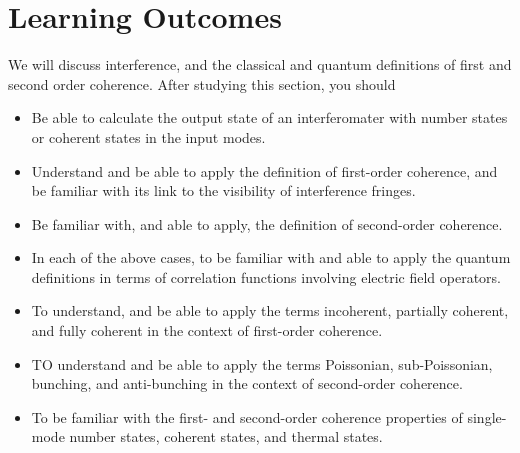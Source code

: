 \documentclass[a4paper, 11pt, normalem]{report}
\begin{document}
\section{Learning Outcomes}
We will discuss interference, and the classical and quantum definitions of first and second order coherence. 
After studying this section, you should
\begin{itemize}
    \item Be able to calculate the output state of an interferomater with number states or coherent states in the input modes.
    \item Understand and be able to apply the definition of first-order coherence, and be familiar with its link to the visibility of interference fringes. 
    \item Be familiar with, and able to apply, the definition of second-order coherence.
    \item In each of the above cases, to be familiar with and able to apply the quantum definitions in terms of correlation functions involving electric field operators. 
    \item To understand, and be able to apply the terms incoherent, partially coherent, and fully coherent in the context of first-order coherence.
    \item TO understand and be able to apply the terms Poissonian, sub-Poissonian, bunching, and anti-bunching in the context of second-order coherence.
    \item To be familiar with the first- and second-order coherence properties of single-mode number states, coherent states, and thermal states.
\end{itemize}
\end{document}
